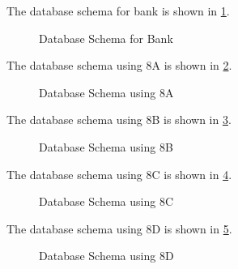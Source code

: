 \documentclass[12pt,letterpaper,titlepage,en-US]{article}
\begin{document}
\begin{homeworkProblem}

The database schema for bank is shown in \cref{bank_schema}.

\begin{figure}[!htb]
\centering
  \caption{Database Schema for Bank}
  \label{bank_schema}
\end{figure}

\end{homeworkProblem}

\begin{homeworkProblem}
\begin{homeworkSubProblem}[Use 8A]
The database schema using 8A is shown in \cref{sales_schema_a}.

\begin{figure}[!htb]
\centering
  \caption{Database Schema using 8A}
  \label{sales_schema_a}
\end{figure}
\end{homeworkSubProblem}

\pagebreak

\begin{homeworkSubProblem}[Use 8B]
The database schema using 8B is shown in \cref{sales_schema_b}.

\begin{figure}[!htb]
\centering
  \caption{Database Schema using 8B}
  \label{sales_schema_b}
\end{figure}
\end{homeworkSubProblem}

\pagebreak

\begin{homeworkSubProblem}[Use 8C]
The database schema using 8C is shown in \cref{sales_schema_c}.

\begin{figure}[!htb]
\centering
  \caption{Database Schema using 8C}
  \label{sales_schema_c}
\end{figure}
\end{homeworkSubProblem}

\pagebreak

\begin{homeworkSubProblem}[Use 8D]
The database schema using 8D is shown in \cref{sales_schema_d}.

\begin{figure}[!htb]
\centering
  \caption{Database Schema using 8D}
  \label{sales_schema_d}
\end{figure}
\end{homeworkSubProblem}

\end{homeworkProblem}
\end{document}
